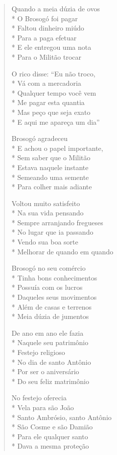 \begin{verse}
Quando a meia dúzia de ovos\\*
O Brosogó foi pagar\\*
Faltou dinheiro miúdo\\*
Para a paga efetuar\\*
E ele entregou uma nota\\*
Para o Militão trocar

O rico disse: ``Eu não troco,\\*
Vá com a mercadoria\\*
Qualquer tempo você vem\\*
Me pagar esta quantia\\*
Mas peço que seja exato\\*
E aqui me apareça um dia''

Brosogó agradeceu\\*
E achou o papel importante,\\*
Sem saber que o Militão\\*
Estava naquele instante\\*
Semeando uma semente\\*
Para colher mais adiante

Voltou muito satisfeito\\*
Na sua vida pensando\\*
Sempre arranjando fregueses\\*
No lugar que ia passando\\*
Vendo sua boa sorte\\*
Melhorar de quando em quando

Brosogó no seu comércio\\*
Tinha bons conhecimentos\\*
Possuía com os lucros\\*
Daqueles seus movimentos\\*
Além de casas e terrenos\\*
Meia dúzia de jumentos

De ano em ano ele fazia\\*
Naquele seu patrimônio\\*
Festejo religioso\\*
No dia de santo Antônio\\*
Por ser o aniversário\\*
Do seu feliz matrimônio

No festejo oferecia\\*
Vela para são João\\*
Santo Ambrósio, santo Antônio\\*
São Cosme e são Damião\\*
Para ele qualquer santo\\*
Dava a mesma proteção


\end{verse}

